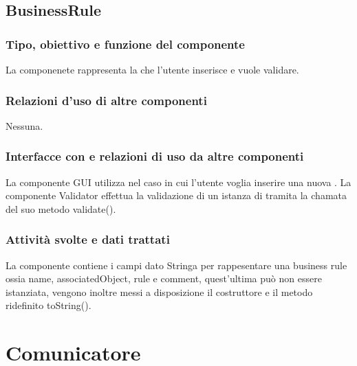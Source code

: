 \documentclass[11pt,titlepage,a4paper]{report}
\begin{document}
\subsection{BusinessRule}
\subsubsection{Tipo, obiettivo e funzione del componente}
La componenete \BR rappresenta la \br che l'utente inserisce e vuole validare.
\subsubsection{Relazioni d'uso di altre componenti}
Nessuna.
\subsubsection{Interfacce con e relazioni di uso da altre componenti}
La componente GUI utilizza \BR nel caso in cui l'utente voglia inserire una nuova \br.
La componente Validator effettua la validazione di un istanza di \BR tramita la chamata del suo metodo validate().
\subsubsection{Attivit\`a svolte e dati trattati}
La componente contiene i campi dato Stringa per rappesentare una business rule ossia name, associatedObject, rule e comment, quest'ultima può non essere istanziata, vengono inoltre messi a disposizione il costruttore e il metodo ridefinito toString().

\section{Comunicatore}
\end{document}
